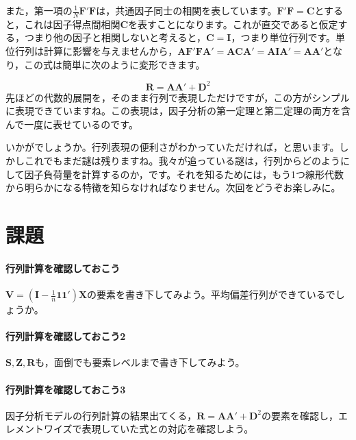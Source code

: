\documentclass{ltjsbook}
\begin{document}
また，第一項の$\frac{1}{N}\bm{F} ' \bm{F}$は，共通因子同士の相関を表しています。$\bm{F'F}=\bm{C}$とすると，これは因子得点間相関$\bm{C}$を表すことになります。これが直交であると仮定する，つまり他の因子と相関しないと考えると，$\bm{C} = \bm{I}$，つまり単位行列です。単位行列は計算に影響を与えませんから，$\bm{AF'FA'}=\bm{ACA'}=\bm{AIA'}=\bm{AA'}$となり，この式は簡単に次のように変形できます。

\begin{equation}
\bm{R} = \bm{A} \bm{A} ' + \bm{D}^2
\end{equation}
先ほどの代数的展開を，そのまま行列で表現しただけですが，この方がシンプルに表現できていますね。この表現は，因子分析の第一定理と第二定理の両方を含んで一度に表せているのです。

いかがでしょうか。行列表現の便利さがわかっていただければ，と思います。しかしこれでもまだ謎は残りますね。我々が追っている謎は，行列からどのようにして因子負荷量を計算するのか，です。それを知るためには，もう1つ線形代数から明らかになる特徴を知らなければなりません。次回をどうぞお楽しみに。
\section{課題}
\paragraph{行列計算を確認しておこう}$ \bm{V} = ( \bm{I} -\frac{1}{n}\bm{1} \bm{1} ')\bm{X} $の要素を書き下してみよう。平均偏差行列ができているでしょうか。
\paragraph{行列計算を確認しておこう2}$ \bm{S},\bm{Z},\bm{R}$も，面倒でも要素レベルまで書き下してみよう。
\paragraph{行列計算を確認しておこう3}因子分析モデルの行列計算の結果出てくる，$\bm{R} = \bm{A} \bm{A} ' + \bm{D}^2$の要素を確認し，エレメントワイズで表現していた式との対応を確認しよう。
\end{document}
